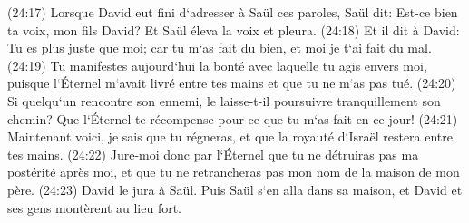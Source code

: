 \verse (24:17) Lorsque David eut fini d`adresser à Saül ces paroles, Saül dit: Est-ce bien ta voix, mon fils David? Et Saül éleva la voix et pleura. 
\verse (24:18) Et il dit à David: Tu es plus juste que moi; car tu m`as fait du bien, et moi je t`ai fait du mal. 
\verse (24:19) Tu manifestes aujourd`hui la bonté avec laquelle tu agis envers moi, puisque l`Éternel m`avait livré entre tes mains et que tu ne m`as pas tué. 
\verse (24:20) Si quelqu`un rencontre son ennemi, le laisse-t-il poursuivre tranquillement son chemin? Que l`Éternel te récompense pour ce que tu m`as fait en ce jour! 
\verse (24:21) Maintenant voici, je sais que tu régneras, et que la royauté d`Israël restera entre tes mains. 
\verse (24:22) Jure-moi donc par l`Éternel que tu ne détruiras pas ma postérité après moi, et que tu ne retrancheras pas mon nom de la maison de mon père. 
\verse (24:23) David le jura à Saül. Puis Saül s`en alla dans sa maison, et David et ses gens montèrent au lieu fort. 

